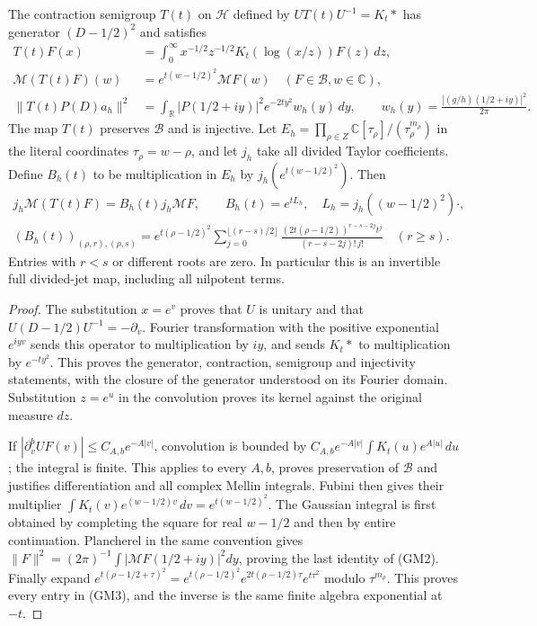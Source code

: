 \begin{theorem}
The contraction semigroup $T(t)$ on $\mathcal H$ defined by
$UT(t)U^{-1}=K_t*$ has generator $(D-1/2)^2$ and satisfies
\begin{equation}\tag{GM2}
 \begin{split}
 T(t)F(x)&=\int_0^\infty
       x^{-1/2}z^{-1/2}K_t(\log(x/z))F(z)\,dz,\\
 \mathcal M(T(t)F)(w)&=e^{t(w-1/2)^2}\mathcal M F(w)
       \quad(F\in\mathscr B, w\in\mathbb C),\\
 \|T(t)P(D)a_h\|^2&=\int_{\mathbb R}
       |P(1/2+iy)|^2 e^{-2ty^2} w_h(y)\,dy,\qquad
 w_h(y)=\frac{|(g/h)(1/2+iy)|^2}{2\pi}.
 \end{split}
\end{equation}
The map $T(t)$ preserves $\mathscr B$ and is injective.  Let
$E_h=\prod_{\rho\in Z}\mathbb C[\tau_\rho]/(\tau_\rho^{m_\rho})$
in the literal coordinates $\tau_\rho=w-\rho$, and let $j_h$ take
all divided Taylor coefficients.  Define $B_h(t)$ to be multiplication
in $E_h$ by $j_h(e^{t(w-1/2)^2})$.  Then
\begin{equation}\tag{GM3}
 \begin{gathered}
 j_h\mathcal M(T(t)F)=B_h(t)j_h\mathcal M F,\qquad
 B_h(t)=e^{tL_h},\quad L_h=j_h((w-1/2)^2)\cdot,\\
 (B_h(t))_{(\rho,r),(\rho,s)}
 =e^{t(\rho-1/2)^2}
 \sum_{j=0}^{\lfloor(r-s)/2\rfloor}
 \frac{(2t(\rho-1/2))^{r-s-2j}t^j}{(r-s-2j)!\,j!}
 \quad(r\geq s).
 \end{gathered}
\end{equation}
Entries with $r<s$ or different roots are zero.  In particular this is
an invertible full divided-jet map, including all nilpotent terms.
\end{theorem}
\begin{proof}
The substitution $x=e^v$ proves that $U$ is unitary and that
$U(D-1/2)U^{-1}=-\partial_v$.  Fourier transformation with the
positive exponential $e^{iyv}$ sends this operator to multiplication
by $iy$, and sends $K_t*$ to multiplication by $e^{-ty^2}$.
This proves the generator, contraction, semigroup and injectivity
statements, with the closure of the generator understood on its
Fourier domain.  Substitution $z=e^u$ in the convolution proves its
kernel against the original measure $dz$.

If $|\partial_v^b UF(v)|\leq C_{A,b}e^{-A|v|}$, convolution is bounded
by $C_{A,b}e^{-A|v|}\int K_t(u)e^{A|u|}\,du$; the integral is finite.
This applies to every $A,b$, proves preservation of $\mathscr B$ and
justifies differentiation and all complex Mellin integrals.  Fubini
then gives their multiplier $\int K_t(v)e^{(w-1/2)v}\,dv
=e^{t(w-1/2)^2}$.  The Gaussian integral is first obtained by
completing the square for real $w-1/2$ and then by entire continuation.
Plancherel in the same convention gives
$\|F\|^2=(2\pi)^{-1}\int|\mathcal M F(1/2+iy)|^2dy$, proving the
last identity of (GM2).  Finally expand
$e^{t(\rho-1/2+\tau)^2}
=e^{t(\rho-1/2)^2}e^{2t(\rho-1/2)\tau}e^{t\tau^2}$
modulo $\tau^{m_\rho}$.  This proves every entry in (GM3), and the
inverse is the same finite algebra exponential at $-t$.
\end{proof}


